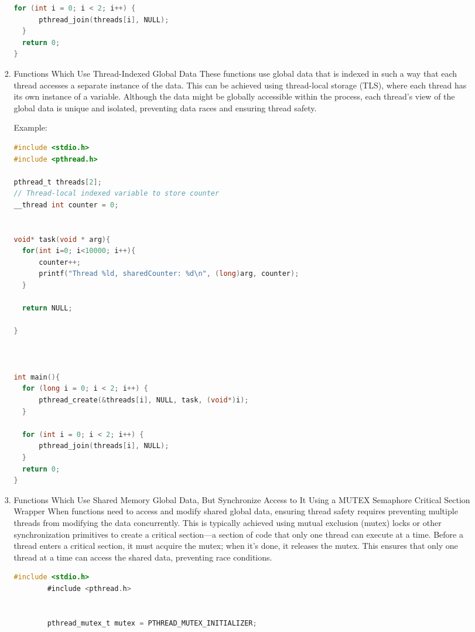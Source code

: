 \documentclass[a4paper,11pt]{article}%
\newenvironment{qanda}{\setlength{\parindent}{0pt}}{\bigskip}
\begin{document}
\begin{qanda}
\begin{enumerate}
\begin{enumerate}
\begin{enumerate}
\begin{lstlisting}[language=C]
  for (int i = 0; i < 2; i++) {
	  pthread_join(threads[i], NULL);
  }
  return 0;
}
\end{lstlisting}
					      \item  Functions Which Use Thread-Indexed Global Data
					            These functions use global data that is indexed in such a way that each thread accesses a separate instance of the data. This can be achieved using thread-local storage (TLS), where each thread has its own instance of a variable. Although the data might be globally accessible within the process, each thread's view of the global data is unique and isolated, preventing data races and ensuring thread safety.

					            Example:
					            \begin{lstlisting}[language=C]
#include <stdio.h>
#include <pthread.h>

pthread_t threads[2];
// Thread-local indexed variable to store counter
__thread int counter = 0;


void* task(void * arg){
  for(int i=0; i<10000; i++){
	  counter++;
	  printf("Thread %ld, sharedCounter: %d\n", (long)arg, counter);
  }

  return NULL;

}



int main(){
  for (long i = 0; i < 2; i++) {
	  pthread_create(&threads[i], NULL, task, (void*)i);
  }

  for (int i = 0; i < 2; i++) {
	  pthread_join(threads[i], NULL);
  }
  return 0;
}
		\end{lstlisting}
					      \item Functions Which Use Shared Memory Global Data, But Synchronize Access to It Using a MUTEX Semaphore Critical Section Wrapper
					            When functions need to access and modify shared global data, ensuring thread safety requires preventing multiple threads from modifying the data concurrently. This is typically achieved using mutual exclusion (mutex) locks or other synchronization primitives to create a critical section—a section of code that only one thread can execute at a time. Before a thread enters a critical section, it must acquire the mutex; when it's done, it releases the mutex. This ensures that only one thread at a time can access the shared data, preventing race conditions.
					            \begin{lstlisting}[language=C]
		#include <stdio.h>
		#include <pthread.h>
		
		
		pthread_mutex_t mutex = PTHREAD_MUTEX_INITIALIZER;
		

\end{lstlisting}
\end{enumerate}
\end{enumerate}
\end{enumerate}
\end{qanda}
\end{document}
